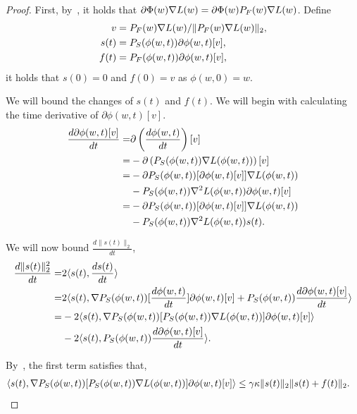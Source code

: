 \begin{proof}

First, by~, it holds that $\partial \Phi(w) \nabla L(w) = \partial \Phi(w)  {P}_F(w) \nabla L(w)$. Define
\begin{align*} 
    v &= {P}_F(w) \nabla L(w) / \|{P}_F(w) \nabla L(w)\|_2, \\
    s(t) &= {P}_S(\phi(w,t)) \partial \phi(w,t)[v], \\
    f(t) &= {P}_F(\phi(w,t)) \partial \phi(w,t)[v],
\end{align*}
it holds that $s(0) = 0$ and $f(0) = v$ as $\phi(w,0) = w$.

We will bound the changes of $s(t)$ and $f(t)$. We will begin with calculating the time derivative of $\partial \phi(w,t)[v]$.
\begin{align}
    \frac{d \partial \phi(w,t)[v]}{dt} =& \partial\left( \frac{d\phi(w,t)}{dt} \right)[v]\notag \\
    =& -\partial\left({P}_S(\phi(w,t)) \nabla L(\phi(w,t)) \right)[v] \notag \\
    =& - \partial {P}_S(\phi(w,t))[\partial \phi(w,t)[v]] \nabla L(\phi(w,t)) \notag\\
    &- {P}_S(\phi(w,t)) \nabla^2 L(\phi(w,t)) \partial \phi(w,t)[v] \notag \\
    =& - \partial {P}_S(\phi(w,t))[\partial \phi(w,t)[v]] \nabla L(\phi(w,t)) \notag\\
    &- {P}_S(\phi(w,t)) \nabla^2 L(\phi(w,t)) s(t). \label{eq:doublepartialphi} 
\end{align}


We will now bound $\frac{d \| s(t) \|_2}{dt}$,
\begin{align*}
    \frac{d \| s(t) \|_2^2}{dt} =& 2\langle s(t), \frac{d s(t)}{dt} \rangle \\
    =& 2\langle s(t), \nabla {P}_S(\phi(w,t)) [\frac{d \phi(w,t)}{dt}] \partial \phi(w,t)[v] 
    +  {P}_S(\phi(w,t))  \frac{d \partial \phi(w,t)[v]}{dt}  \rangle \\
    =& -2 \langle s(t), \nabla {P}_S(\phi(w,t)) [{P}_S(\phi(w,t)) \nabla L(\phi(w,t))] \partial \phi(w,t)[v] \rangle \\
    & -2\langle s(t),  {P}_S(\phi(w,t))  \frac{d \partial \phi(w,t)[v]}{dt}  \rangle.
\end{align*}

By~, the first term satisfies that,
\begin{align*}
    \langle s(t), \nabla {P}_S(\phi(w,t)) [{P}_S(\phi(w,t)) \nabla L(\phi(w,t))] \partial \phi(w,t)[v] \rangle  &\le \gamma \kappa \| s(t) \|_2 \| s(t) + f(t) \|_2.
\end{align*}


\end{proof}
